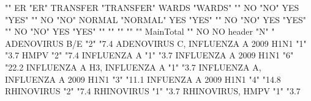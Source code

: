 \documentclass{article}\usepackage[]{graphicx}\usepackage[]{color}
\begin{document}
                                    ""                                   
ER                                  "ER"                                 
TRANSFER                            "TRANSFER"                           
WARDS                               "WARDS"                              
                                    ""                                   
NO                                  "NO"                                 
YES                                 "YES"                                
                                    ""                                   
NO                                  "NO"                                 
NORMAL                              "NORMAL"                             
YES                                 "YES"                                
                                    ""                                   
NO                                  "NO"                                 
YES                                 "YES"                                
                                    ""                                   
NO                                  "NO"                                 
YES                                 "YES"                                
                                    ""                                   
                                    ""                                   
                                    ""                                   
                                    ""                                   
                                    ""                                   
MainTotal                           ""                                   
                                    NO             NO %
header                              "N"            "%
ADENOVIRUS B/E                      "2"            "7.4%
ADENOVIRUS C, INFLUENZA A 2009 H1N1 "1"            "3.7%
HMPV                                "2"            "7.4%
INFLUENZA A                         "1"            "3.7%
INFLUENZA A 2009 H1N1               "6"            "22.2%
INFLUENZA A H3, INFLUENZA A         "1"            "3.7%
INFLUENZA A, INFLUENZA A 2009 H1N1  "3"            "11.1%
INFUENZA A 2009 H1N1                "4"            "14.8%
RHINOVIRUS                          "2"            "7.4%
RHINOVIRUS                          "1"            "3.7%
RHINOVIRUS, HMPV                    "1"            "3.7%
\end{document}
